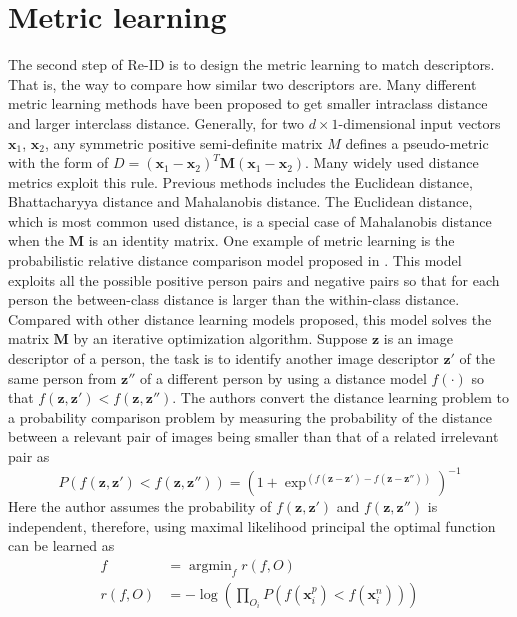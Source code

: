 \section{Metric learning}
The second step of Re-ID is to design the metric learning to match descriptors. That is, the way to compare how similar two descriptors are. Many different metric learning methods have been proposed \cite{KISSME, LFDA, PCCA, TDL, PRDC, LMNN, KLFDA, KCCA, KernelVersionMetrics, NFST, ITML} to get smaller intraclass distance and larger interclass distance. Generally, for two $d\times 1$-dimensional input vectors $\bm{x}_1$, $\bm{x}_2$, any symmetric positive semi-definite matrix $M$ defines a pseudo-metric with the form of $D = (\bm{x}_1 -\bm{x}_2)^T\bm{M}(\bm{x}_1 - \bm{x}_2)$. Many widely used distance metrics exploit this rule. Previous methods includes the Euclidean distance, Bhattacharyya distance and Mahalanobis distance. The Euclidean distance, which is most common used distance, is a special case of Mahalanobis distance when the $\bm{M}$ is an identity matrix. One example of metric learning is the probabilistic relative distance comparison model proposed in \cite{PRDC}. This model exploits all the possible positive person pairs and negative pairs so that for each person the between-class distance is larger than the within-class distance. Compared with other distance learning models proposed, this model solves the matrix $\bm{M}$ by an iterative optimization algorithm. Suppose $\bm{z}$ is an image descriptor of a person, the task is to identify another image descriptor $\bm{z}'$ of the same person from $\bm{z}''$ of a different person by using a distance model $f(\cdot)$ so that $f(\bm{z}, \bm{z}')< f(\bm{z}, \bm{z}'')$. The authors convert the distance learning problem to a probability comparison problem by measuring the probability of the distance between a relevant pair of images being smaller than that of a related irrelevant pair as
\begin{equation}
P(f(\bm{z},\bm{z}')<f(\bm{z},\bm{z}'')) = (1+\exp^{(f(\bm{z}-\bm{z}')-f(\bm{z}-\bm{z}''))})^{-1}
\end{equation}
Here the author assumes the probability of $f(\bm{z},\bm{z}')$ and $f(\bm{z},\bm{z}'')$ is independent, therefore, using maximal likelihood principal the optimal function can be learned as
\begin{equation}
\begin{aligned}
f &= \mathop{\arg\min}_f r(f,O) \\
r(f,O) &= -\log(\prod_{O_i}P(f(\bm{x}_i^p) < f(\bm{x}_i^n)))
\end{aligned}
\end{equation}
